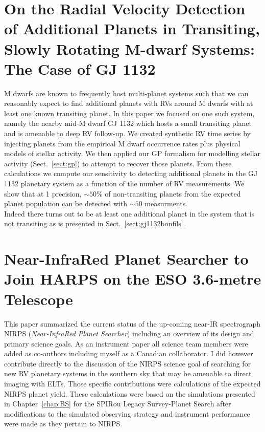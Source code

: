\section{On the Radial Velocity Detection of Additional Planets in Transiting,
  Slowly Rotating M-dwarf Systems: The Case of GJ 1132 \citep{cloutier17a}}
\label{app:gj1132}
M dwarfs are known to frequently host multi-planet systems such that we can
reasonably expect to find additional planets with RVs around M dwarfs with at
least one known transiting planet. In this paper we focused on one such
system, namely the nearby mid-M dwarf GJ 1132 which hosts a small transiting
planet and is amenable to deep RV follow-up. We created synthetic RV time series
by injecting planets from the empirical M dwarf occurrence rates plus physical
models of stellar activity. We then applied our GP formalism for modelling
stellar activity (Sect.~\ref{sect:gp}) to attempt to recover those planets.
From these calculations we compute our sensitivity to detecting additional
planets in the GJ 1132 planetary system as a function of the number of RV
measurements. We show that at 1 \mps{} precision, $\sim 50$\% of non-transiting
planets from the expected planet population can be detected with $\sim 50$
measurments. \\

Indeed there turns out to be at least one additional planet in the system that
is not transiting as is presented in Sect.~\ref{sect:gj1132bonfils}.

\section{Near-InfraRed Planet Searcher to Join HARPS on the ESO 3.6-metre
  Telescope \citep{bouchy17}}
This paper summarized the current status of the up-coming near-IR spectrograph
NIRPS (\emph{Near-InfraRed Planet Searcher}) including an overview of its design
and primary science goals. As an instrument paper all science team members were
added as co-authors including myself as a Canadian collaborator. I did however
contribute directly to the discussion of the NIRPS science goal of searching
for new RV planetary systems in the southern sky that may be amenable to direct
imaging with ELTs. Those specific contributions were calculations of the
expected NIRPS planet yield. These calculations were based on the simulations
presented in Chapter~\ref{chap:BS} for the
SPIRou Legacy Survey-Planet Search after modifications to the simulated
observing strategy and instrument performance were made as they pertain to
NIRPS.


